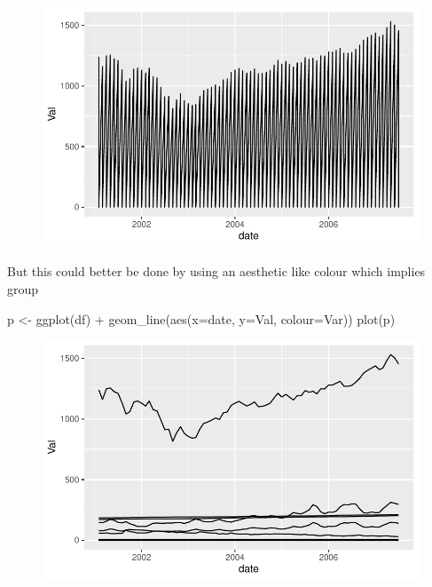 \documentclass[
  letterpaper,
]{book}
\newenvironment{Shaded}{\begin{snugshade}}{\end{snugshade}}
\newcommand{\AttributeTok}[1]{\textcolor[rgb]{0.40,0.45,0.13}{#1}}
\newcommand{\FunctionTok}[1]{\textcolor[rgb]{0.28,0.35,0.67}{#1}}
\newcommand{\NormalTok}[1]{\textcolor[rgb]{0.00,0.23,0.31}{#1}}
\newcommand{\OtherTok}[1]{\textcolor[rgb]{0.00,0.23,0.31}{#1}}
\newcommand{\SpecialCharTok}[1]{\textcolor[rgb]{0.37,0.37,0.37}{#1}}
\begin{document}
\begin{figure}[H]

{\centering \includegraphics{Appendix1_files/figure-pdf/unnamed-chunk-7-1.pdf}

}

\end{figure}

But this could better be done by using an aesthetic like colour which
implies group

\begin{Shaded}
\begin{Highlighting}[]
\NormalTok{p  }\OtherTok{\textless{}{-}} \FunctionTok{ggplot}\NormalTok{(df) }\SpecialCharTok{+}
  \FunctionTok{geom\_line}\NormalTok{(}\FunctionTok{aes}\NormalTok{(}\AttributeTok{x=}\NormalTok{date, }\AttributeTok{y=}\NormalTok{Val, }\AttributeTok{colour=}\NormalTok{Var))}
\FunctionTok{plot}\NormalTok{(p)}
\end{Highlighting}
\end{Shaded}

\begin{figure}[H]

{\centering \includegraphics{Appendix1_files/figure-pdf/unnamed-chunk-8-1.pdf}

}

\end{figure}
\end{document}
